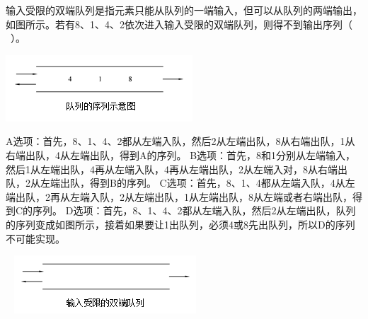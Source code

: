 \question 输入受限的双端队列是指元素只能从队列的一端输入，但可以从队列的两端输出，如图所示。若有8、1、4、2依次进入输入受限的双端队列，则得不到输出序列（
~）。~

\includegraphics[width=2.75000in,height=0.97917in]{computerassets/95a34a22ed1cd42d10a23b488d7f98e8.png}
\par{}
\begin{solution}A选项：首先，8、1、4、2都从左端入队，然后2从左端出队，8从右端出队，1从右端出队，4从左端出队，得到A的序列。
B选项：首先，8和1分别从左端输入，然后1从左端出队，4再从左端入队，4再从左端出队，2从左端入对，8从右端出队，2从左端出队，得到B的序列。
C选项：首先，8、1、4都从左端入队，4从左端出队，2再从左端入队，2从左端出队，1从左端出队，8从左端或者右端出队，得到C的序列。
D选项：首先，8、1、4、2都从左端入队，然后2从左端出队，队列的序列变成如图所示，接着如果要让1出队列，必须4或8先出队列，所以D的序列不可能实现。

~
\includegraphics[width=2.67708in,height=0.85417in]{computerassets/5165378b619f5b040e98b8bafb986fda.png}
\end{solution}

